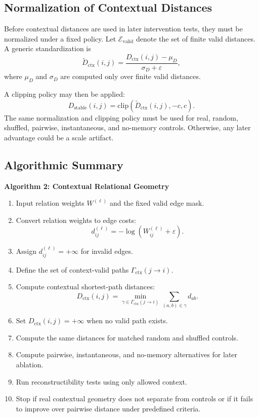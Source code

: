 \documentclass[11pt]{article}
\begin{document}
\subsection{Normalization of Contextual Distances}

Before contextual distances are used in later intervention tests, they must be normalized under a fixed policy. Let $\mathcal{E}_{\mathrm{valid}}$ denote the set of finite valid distances. A generic standardization is
\[
\widetilde{D}_{\mathrm{ctx}}(i,j)
=
\frac{D_{\mathrm{ctx}}(i,j)-\mu_D}{\sigma_D+\varepsilon},
\]
where $\mu_D$ and $\sigma_D$ are computed only over finite valid distances.

A clipping policy may then be applied:
\[
D_{\mathrm{stable}}(i,j)
=
\mathrm{clip}(\widetilde{D}_{\mathrm{ctx}}(i,j),-c,c).
\]
The same normalization and clipping policy must be used for real, random, shuffled, pairwise, instantaneous, and no-memory controls. Otherwise, any later advantage could be a scale artifact.

\subsection{Algorithmic Summary}

\noindent\textbf{Algorithm 2: Contextual Relational Geometry}

\begin{enumerate}[label=\arabic*.]
    \item Input relation weights $W^{(\ell)}$ and the fixed valid edge mask.
    \item Convert relation weights to edge costs:
    \[
    d_{ij}^{(\ell)}=-\log(W_{ij}^{(\ell)}+\varepsilon).
    \]
    \item Assign $d_{ij}^{(\ell)}=+\infty$ for invalid edges.
    \item Define the set of context-valid paths $\Gamma_{\mathrm{ctx}}(j\to i)$.
    \item Compute contextual shortest-path distances:
    \[
    D_{\mathrm{ctx}}(i,j)=\min_{\gamma\in\Gamma_{\mathrm{ctx}}(j\to i)}\sum_{(a,b)\in\gamma}d_{ab}.
    \]
    \item Set $D_{\mathrm{ctx}}(i,j)=+\infty$ when no valid path exists.
    \item Compute the same distances for matched random and shuffled controls.
    \item Compute pairwise, instantaneous, and no-memory alternatives for later ablation.
    \item Run reconstructibility tests using only allowed context.
    \item Stop if real contextual geometry does not separate from controls or if it fails to improve over pairwise distance under predefined criteria.
\end{enumerate}
\end{document}

